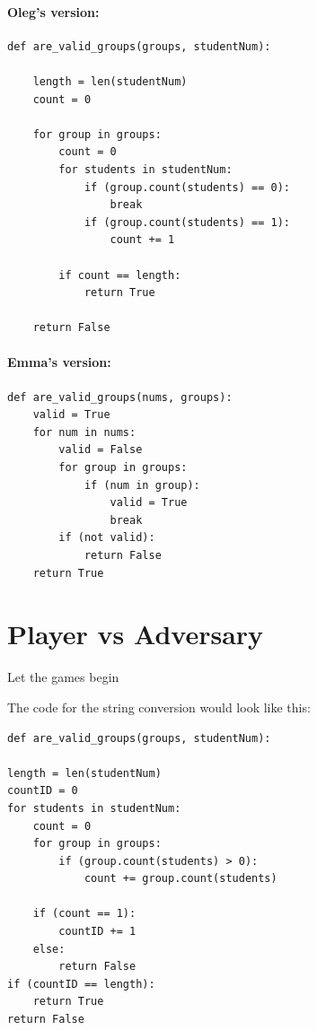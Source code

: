 \documentclass[twocolumn, 10pt]{article}
\begin{document}
\paragraph{Oleg's version:}

\footnotesize
\begin{verbatim}
def are_valid_groups(groups, studentNum):

    length = len(studentNum)
    count = 0
    
    for group in groups:
        count = 0
        for students in studentNum:
            if (group.count(students) == 0):
                break
            if (group.count(students) == 1):
                count += 1
        
        if count == length:
            return True
        
    return False
\end{verbatim}
\normalsize

\paragraph{Emma's version:}

\footnotesize
\begin{verbatim}
def are_valid_groups(nums, groups):
    valid = True
    for num in nums:
        valid = False
        for group in groups:
            if (num in group): 
                valid = True
                break
        if (not valid):
            return False
    return True
\end{verbatim}
\normalsize

\section{Player vs Adversary}
Let the games begin

The code for the string conversion would look like this:

\footnotesize
\begin{verbatim}
def are_valid_groups(groups, studentNum):

length = len(studentNum)
countID = 0   
for students in studentNum:
    count = 0
    for group in groups:
        if (group.count(students) > 0):
            count += group.count(students)

    if (count == 1):
        countID += 1
    else:
        return False
if (countID == length):
    return True
return False
\end{verbatim}
\normalsize
\end{document}
